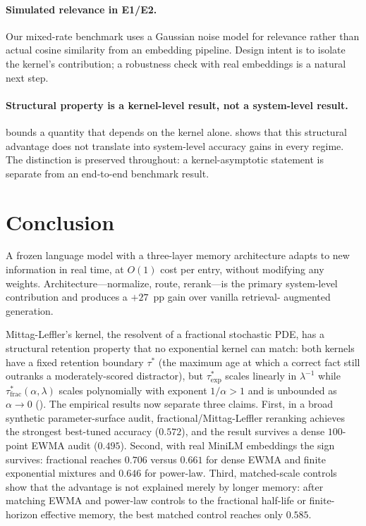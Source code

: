 \documentclass[11pt]{article}
\theoremstyle{plain}
\theoremstyle{definition}
\begin{document}
\paragraph{Simulated relevance in E1/E2.}  Our
mixed-rate benchmark uses a Gaussian noise model for
relevance rather than actual cosine similarity from
an embedding pipeline.  Design intent is to isolate
the kernel's contribution; a robustness check with
real embeddings is a natural next step.

\paragraph{Structural property is a kernel-level
result, not a system-level result.}
 bounds a quantity that depends
on the kernel alone.  
shows that this structural advantage does not
translate into system-level accuracy gains in every
regime.  The distinction is preserved throughout:
a kernel-asymptotic statement is separate from an
end-to-end benchmark result.


\section{Conclusion}\label{sec:conclusion}

A frozen language model with a three-layer memory
architecture adapts to new information in real time,
at $O(1)$ cost per entry, without modifying any
weights.  Architecture---normalize, route,
rerank---is the primary system-level contribution and
produces a $+27$~pp gain over vanilla retrieval-
augmented generation.

Mittag-Leffler's kernel, the resolvent of a
fractional stochastic PDE, has a structural retention
property that no exponential kernel can match: both
kernels have a fixed retention boundary $\tau^*$
(the maximum age at which a correct fact still
outranks a moderately-scored distractor), but
$\tau^*_{\mathrm{exp}}$ scales linearly in
$\lambda^{-1}$ while $\tau^*_{\mathrm{frac}}(\alpha,
\lambda)$ scales polynomially with exponent
$1/\alpha > 1$ and is unbounded as $\alpha \to 0$
().  The empirical results now
separate three claims.  First, in a broad synthetic
parameter-surface audit, fractional/Mittag-Leffler
reranking achieves the strongest best-tuned accuracy
($0.572$), and the result survives a dense $100$-point
EWMA audit ($0.495$).  Second, with real MiniLM
embeddings the sign survives: fractional reaches
$0.706$ versus $0.661$ for dense EWMA and finite
exponential mixtures and $0.646$ for power-law.  Third,
matched-scale controls show that the advantage is not
explained merely by longer memory: after matching EWMA
and power-law controls to the fractional half-life or
finite-horizon effective memory, the best matched
control reaches only $0.585$.
\end{document}
